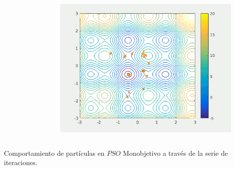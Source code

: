 \documentclass[usenames,dvipsnames]{beamer}
\begin{document}
\begin{frame}
\begin{columns}[t]
\begin{column}{.45\textwidth}
\begin{figure}[H]
\end{figure}
\end{column}
\begin{column}{.45\textwidth}
    \begin{figure}[H]
        \centering
        \includegraphics[width=\textwidth]{./graphics/ejemplopso/capas-99.png}   
    \end{figure}
\end{column}
\end{columns}
Comportamiento de partículas en $PSO$ Monobjetivo a través de la serie de iteraciones.

\end{frame}
\end{document}
